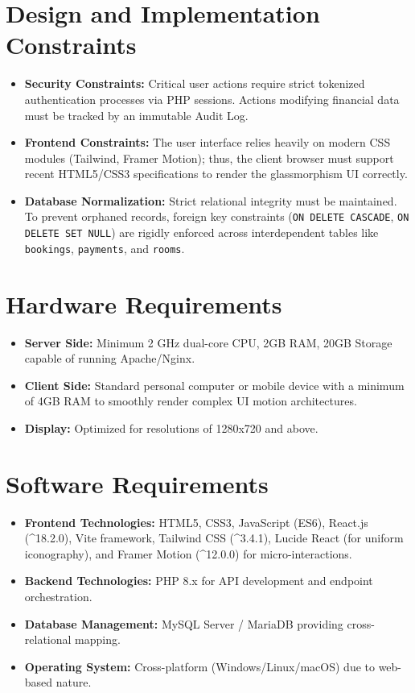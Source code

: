 \documentclass[12pt,a4paper]{report}
\begin{document}
\section{Design and Implementation Constraints}
\begin{itemize}
    \item \textbf{Security Constraints:} Critical user actions require strict tokenized authentication processes via PHP sessions. Actions modifying financial data must be tracked by an immutable Audit Log.
    \item \textbf{Frontend Constraints:} The user interface relies heavily on modern CSS modules (Tailwind, Framer Motion); thus, the client browser must support recent HTML5/CSS3 specifications to render the glassmorphism UI correctly.
    \item \textbf{Database Normalization:} Strict relational integrity must be maintained. To prevent orphaned records, foreign key constraints (\texttt{ON DELETE CASCADE}, \texttt{ON DELETE SET NULL}) are rigidly enforced across interdependent tables like \texttt{bookings}, \texttt{payments}, and \texttt{rooms}.
\end{itemize}

\section{Hardware Requirements}
\begin{itemize}
    \item \textbf{Server Side:} Minimum 2 GHz dual-core CPU, 2GB RAM, 20GB Storage capable of running Apache/Nginx.
    \item \textbf{Client Side:} Standard personal computer or mobile device with a minimum of 4GB RAM to smoothly render complex UI motion architectures.
    \item \textbf{Display:} Optimized for resolutions of 1280x720 and above.
\end{itemize}

\section{Software Requirements}
\begin{itemize}
    \item \textbf{Frontend Technologies:} HTML5, CSS3, JavaScript (ES6), React.js (\textasciicircum 18.2.0), Vite framework, Tailwind CSS (\textasciicircum 3.4.1), Lucide React (for uniform iconography), and Framer Motion (\textasciicircum 12.0.0) for micro-interactions.
    \item \textbf{Backend Technologies:} PHP 8.x for API development and endpoint orchestration.
    \item \textbf{Database Management:} MySQL Server / MariaDB providing cross-relational mapping.
    \item \textbf{Operating System:} Cross-platform (Windows/Linux/macOS) due to web-based nature.
\end{itemize}
\end{document}
